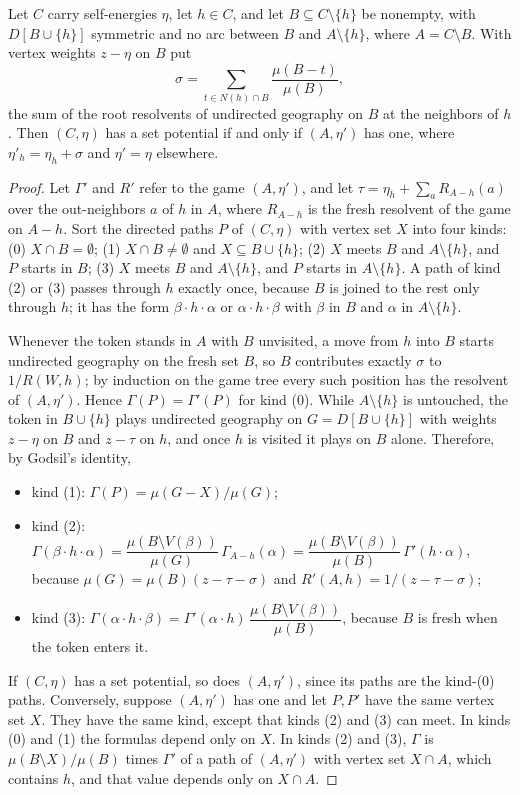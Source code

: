 \begin{lemma}\label{lem:branches}
Let $C$ carry self-energies $\eta$, let $h\in C$, and let $B\subseteq C\setminus\{h\}$ be nonempty, with $D[B\cup\{h\}]$ symmetric and no arc between $B$ and $A\setminus\{h\}$, where $A=C\setminus B$. With vertex weights $z-\eta$ on $B$ put
\[
\sigma=\sum_{t\in N(h)\cap B}\frac{\mu(B-t)}{\mu(B)},
\]
the sum of the root resolvents of undirected geography on $B$ at the neighbors of $h$. Then $(C,\eta)$ has a set potential if and only if $(A,\eta')$ has one, where $\eta'_h=\eta_h+\sigma$ and $\eta'=\eta$ elsewhere.
\end{lemma}
\begin{proof}
Let $\Gamma'$ and $R'$ refer to the game $(A,\eta')$, and let $\tau=\eta_h+\sum_aR_{A-h}(a)$ over the out-neighbors $a$ of $h$ in $A$, where $R_{A-h}$ is the fresh resolvent of the game on $A-h$. Sort the directed paths $P$ of $(C,\eta)$ with vertex set $X$ into four kinds: (0) $X\cap B=\emptyset$; (1) $X\cap B\neq\emptyset$ and $X\subseteq B\cup\{h\}$; (2) $X$ meets $B$ and $A\setminus\{h\}$, and $P$ starts in $B$; (3) $X$ meets $B$ and $A\setminus\{h\}$, and $P$ starts in $A\setminus\{h\}$. A path of kind (2) or (3) passes through $h$ exactly once, because $B$ is joined to the rest only through $h$; it has the form $\beta\cdot h\cdot\alpha$ or $\alpha\cdot h\cdot\beta$ with $\beta$ in $B$ and $\alpha$ in $A\setminus\{h\}$.

Whenever the token stands in $A$ with $B$ unvisited, a move from $h$ into $B$ starts undirected geography on the fresh set $B$, so $B$ contributes exactly $\sigma$ to $1/R(W,h)$; by induction on the game tree every such position has the resolvent of $(A,\eta')$. Hence $\Gamma(P)=\Gamma'(P)$ for kind (0). While $A\setminus\{h\}$ is untouched, the token in $B\cup\{h\}$ plays undirected geography on $G=D[B\cup\{h\}]$ with weights $z-\eta$ on $B$ and $z-\tau$ on $h$, and once $h$ is visited it plays on $B$ alone. Therefore, by Godsil's identity,
\begin{itemize}
\item kind (1): $\Gamma(P)=\mu(G-X)/\mu(G)$;
\item kind (2): $\Gamma(\beta\cdot h\cdot\alpha)=\dfrac{\mu(B\setminus V(\beta))}{\mu(G)}\,\Gamma_{A-h}(\alpha)=\dfrac{\mu(B\setminus V(\beta))}{\mu(B)}\,\Gamma'(h\cdot\alpha)$, because $\mu(G)=\mu(B)(z-\tau-\sigma)$ and $R'(A,h)=1/(z-\tau-\sigma)$;
\item kind (3): $\Gamma(\alpha\cdot h\cdot\beta)=\Gamma'(\alpha\cdot h)\,\dfrac{\mu(B\setminus V(\beta))}{\mu(B)}$, because $B$ is fresh when the token enters it.
\end{itemize}
If $(C,\eta)$ has a set potential, so does $(A,\eta')$, since its paths are the kind-(0) paths. Conversely, suppose $(A,\eta')$ has one and let $P,P'$ have the same vertex set $X$. They have the same kind, except that kinds (2) and (3) can meet. In kinds (0) and (1) the formulas depend only on $X$. In kinds (2) and (3), $\Gamma$ is $\mu(B\setminus X)/\mu(B)$ times $\Gamma'$ of a path of $(A,\eta')$ with vertex set $X\cap A$, which contains $h$, and that value depends only on $X\cap A$.
\end{proof}

